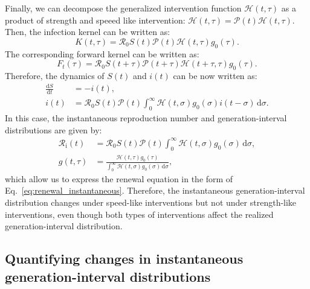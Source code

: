 \documentclass[12pt]{article}
\newcommand{\eref}[1]{Eq.~\ref{eq:#1}}
\newcommand{\Rx}[1]{\ensuremath{{\mathcal R}_{#1}}\xspace}
\newcommand{\Ro}{\Rx{0}}
\newcommand{\Ri}{\Rx{\mathrm{i}}}
\newcommand{\RR}{\ensuremath{{\mathcal R}}\xspace}
\newcommand{\dd}[1]{\ensuremath{\, \mathrm{d}#1}}
\newcommand{\dsigma}{\dd{\sigma}}
\newcommand{\PP}{{\mathcal P}}
\newcommand{\HH}{\ensuremath{\mathcal H}}
\begin{document}
Finally, we can decompose the generalized intervention function $\HH(t, \tau)$ as a product of strength and speeed like intervention: $\HH(t, \tau) = \PP(t) \HH(t, \tau)$. Then, the infection kernel can be written as:
\begin{equation}
K(t, \tau) = \Ro S(t) \PP(t) \HH(t,\tau) g_0(\tau).
\end{equation}
The corresponding forward kernel can be written as:
\begin{equation}
F_t(\tau) = \Ro S(t+\tau) \PP(t + \tau) \HH(t+\tau, \tau) g_0(\tau).
\end{equation}
Therefore, the dynamics of $S(t)$ and $i(t)$ can be now written as:
\begin{align}
\frac{\mathrm{d}S}{\mathrm{d}t} &= - i(t),\\
i(t) &= \Ro S(t) \PP(t) \int_0^\infty \HH(t, \sigma) g_0(\sigma) i(t-\sigma)\dsigma.
\end{align}
In this case, the instantaneous reproduction number and generation-interval distributions are given by:
\begin{align}
\Ri(t) &= \RR_0 S(t) \PP(t) \int_0^\infty \HH(t,\sigma) g_0(\sigma) \dsigma,\\
g(t, \tau) &= \frac{\HH(t,\tau) g_0(\tau)}{\int_0^\infty \HH(t,\sigma) g_0(\sigma) \dsigma},
\end{align}
which allow us to express the renewal equation in the form of \eref{renewal_instantaneous}.
Therefore, the instantaneous generation-interval distribution changes under speed-like interventions but not under strength-like interventions, even though both types of interventions affect the realized generation-interval distribution.


\subsection{Quantifying changes in instantaneous generation-interval distributions}
\end{document}
